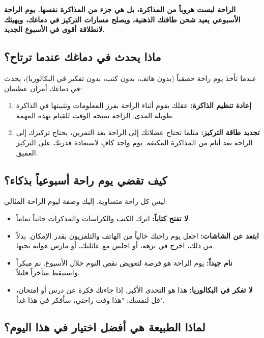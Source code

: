 \documentclass[12pt,a4paper]{book}
\newcommand{\importantAr}[1]{%
	\begin{important}
		\bfseries #1
	\end{important}
}
\begin{document}
	\importantAr{الراحة ليست هروباً من المذاكرة، بل هي جزء من المذاكرة نفسها. يوم الراحة الأسبوعي يعيد شحن طاقتك الذهنية، ويصلح مسارات التركيز في دماغك، ويهيئك لانطلاقة أقوى في الأسبوع الجديد.}
	
	\subsection{ماذا يحدث في دماغك عندما ترتاح؟}
	
	عندما تأخذ يوم راحة حقيقياً (بدون هاتف، بدون كتب، بدون تفكير في البكالوريا)، يحدث في دماغك أمران عظيمان:
	
	\begin{enumerate}
		\item \textbf{إعادة تنظيم الذاكرة:} عقلك يقوم أثناء الراحة بفرز المعلومات وتثبيتها في الذاكرة طويلة المدى. الراحة تمنحه الوقت للقيام بهذه المهمة.
		
		\item \textbf{تجديد طاقة التركيز:} مثلما تحتاج عضلاتك إلى الراحة بعد التمرين، يحتاج تركيزك إلى الراحة بعد أيام من المذاكرة المكثفة. يوم واحد كافٍ لاستعادة قدرتك على التركيز العميق.
	\end{enumerate}
	
	\subsection{كيف تقضي يوم راحة أسبوعياً بذكاء؟}
	
	ليس كل راحة متساوية. إليك وصفة ليوم الراحة المثالي:
	
	\begin{itemize}
		\item \textbf{لا تفتح كتاباً:} اترك الكتب والكراسات والمذكرات جانباً تماماً.
		
		\item \textbf{ابتعد عن الشاشات:} اجعل يوم راحتك خالياً من الهاتف والتلفزيون بقدر الإمكان. بدلاً من ذلك، اخرج في نزهة، أو اجلس مع عائلتك، أو مارس هواية تحبها.
		
		\item \textbf{نام جيداً:} يوم الراحة هو فرصة لتعويض نقص النوم خلال الأسبوع. نم مبكراً واستيقظ متأخراً قليلاً.
		
		\item \textbf{لا تفكر في البكالوريا:} هذا هو التحدي الأكبر. إذا جاءتك فكرة عن درس أو امتحان، قل لنفسك: "هذا وقت راحتي، سأفكر في هذا غداً".
	\end{itemize}

	\subsection{لماذا الطبيعة هي أفضل اختيار في هذا اليوم؟}
	
\end{document}
